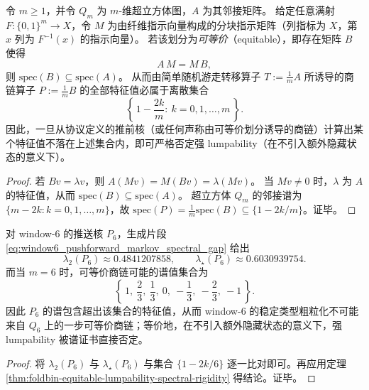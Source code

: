\begin{theorem}\label{thm:foldbin-equitable-lumpability-spectral-rigidity}
令 \(m\ge 1\)，并令 \(Q_m\) 为 \(m\)-维超立方体图，\(A\) 为其邻接矩阵。
给定任意满射 \(F:\{0,1\}^m\to X\)，令 \(M\) 为由纤维指示向量构成的分块指示矩阵（列指标为 \(X\)，第 \(x\) 列为 \(F^{-1}(x)\) 的指示向量）。
若该划分为\emph{可等价}（equitable），即存在矩阵 \(B\) 使得
\[
A\,M=M\,B,
\]
则 \(\mathrm{spec}(B)\subseteq \mathrm{spec}(A)\)。
从而由简单随机游走转移算子 \(T:=\frac{1}{m}A\) 所诱导的商链算子 \(P:=\frac{1}{m}B\) 的全部特征值必属于离散集合
\[
\left\{\,1-\frac{2k}{m}:\ k=0,1,\dots,m\,\right\}.
\]
因此，一旦从协议定义的推前核（或任何声称由可等价划分诱导的商链）计算出某个特征值不落在上述集合内，即可严格否定强 lumpability（在不引入额外隐藏状态的意义下）。
\end{theorem}

\begin{proof}
若 \(Bv=\lambda v\)，则
\(
A(Mv)=M(Bv)=\lambda(Mv)
\)。
当 \(Mv\neq 0\) 时，\(\lambda\) 为 \(A\) 的特征值，从而 \(\mathrm{spec}(B)\subseteq \mathrm{spec}(A)\)。
超立方体 \(Q_m\) 的邻接谱为 \(\{m-2k:k=0,1,\dots,m\}\)，故 \(\mathrm{spec}(P)=\frac{1}{m}\mathrm{spec}(B)\subseteq \{1-2k/m\}\)。证毕。
\end{proof}

\begin{corollary}\label{cor:terminal-window6-nonlumpable-by-spectrum}
对 window-\(6\) 的推送核 \(P_6\)，生成片段 \eqref{eq:window6_pushforward_markov_spectral_gap} 给出
\[
\lambda_2(P_6)\approx 0.4841207858,\qquad
\lambda_\star(P_6)\approx 0.6030939754.
\]
而当 \(m=6\) 时，可等价商链可能的谱值集合为
\[
\left\{\,1,\ \frac23,\ \frac13,\ 0,\ -\frac13,\ -\frac23,\ -1\,\right\}.
\]
因此 \(P_6\) 的谱包含超出该集合的特征值，从而 window-\(6\) 的稳定类型粗粒化不可能来自 \(Q_6\) 上的一步可等价商链；等价地，在不引入额外隐藏状态的意义下，强 lumpability 被谱证书直接否定。
\end{corollary}

\begin{proof}
将 \(\lambda_2(P_6)\) 与 \(\lambda_\star(P_6)\) 与集合 \(\{1-2k/6\}\) 逐一比对即可。再应用定理 \ref{thm:foldbin-equitable-lumpability-spectral-rigidity} 得结论。证毕。
\end{proof}
